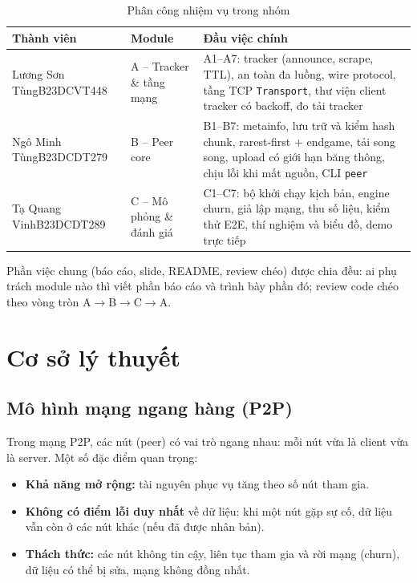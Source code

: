 \documentclass[12pt,a4paper,oneside]{report}
\newcommand{\memberA}{Lương Sơn Tùng}
\newcommand{\memberAid}{B23DCVT448}
\newcommand{\memberB}{Ngô Minh Tùng}
\newcommand{\memberBid}{B23DCDT279}
\newcommand{\memberC}{Tạ Quang Vinh}
\newcommand{\memberCid}{B23DCDT289}
\begin{document}
\begin{table}[H]
\centering
\caption{Phân công nhiệm vụ trong nhóm}
\label{tab:phancong}
\begin{tabularx}{\textwidth}{@{}p{3.6cm}p{3.6cm}L@{}}
\toprule
\textbf{Thành viên} & \textbf{Module} & \textbf{Đầu việc chính}\\\midrule
\memberA\newline\small\memberAid & A -- Tracker \& tầng mạng & A1--A7: tracker (announce, scrape, TTL), an toàn đa luồng, wire protocol, tầng TCP \texttt{Transport}, thư viện client tracker có backoff, đo tải tracker\\\midrule
\memberB\newline\small\memberBid & B -- Peer core & B1--B7: metainfo, lưu trữ và kiểm hash chunk, rarest-first + endgame, tải song song, upload có giới hạn băng thông, chịu lỗi khi mất nguồn, CLI \texttt{peer}\\\midrule
\memberC\newline\small\memberCid & C -- Mô phỏng \& đánh giá & C1--C7: bộ khởi chạy kịch bản, engine churn, giả lập mạng, thu số liệu, kiểm thử E2E, thí nghiệm và biểu đồ, demo trực tiếp\\
\bottomrule
\end{tabularx}
\end{table}

Phần việc chung (báo cáo, slide, README, review chéo) được chia đều: ai phụ trách module nào thì viết phần báo cáo và trình bày phần đó; review code chéo theo vòng tròn A$\rightarrow$B$\rightarrow$C$\rightarrow$A.

\chapter{Cơ sở lý thuyết}

\section{Mô hình mạng ngang hàng (P2P)}

Trong mạng P2P, các nút (peer) có vai trò ngang nhau: mỗi nút vừa là client vừa là server. Một số đặc điểm quan trọng:
\begin{itemize}
  \item \textbf{Khả năng mở rộng:} tài nguyên phục vụ tăng theo số nút tham gia.
  \item \textbf{Không có điểm lỗi duy nhất} về dữ liệu: khi một nút gặp sự cố, dữ liệu vẫn còn ở các nút khác (nếu đã được nhân bản).
  \item \textbf{Thách thức:} các nút không tin cậy, liên tục tham gia và rời mạng (churn), dữ liệu có thể bị sửa, mạng không đồng nhất.
\end{itemize}
\end{document}
